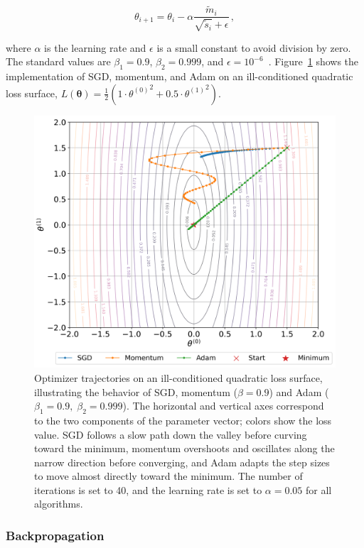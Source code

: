 \begin{equation}
\label{eq:ADAM3}
\theta_{i+1} = \theta_i - \alpha \frac{\tilde m_i}{\sqrt{\tilde s_i} + \epsilon} \,,
\end{equation}

\noindent where $\alpha$ is the learning rate and $\epsilon$ is a small constant to avoid division by zero. The standard values are $\beta_1 = 0.9$, $\beta_2 = 0.999$, and $\epsilon = 10^{-6}$~\cite{murphy_probabilistic_2022}. Figure~\ref{fig:Optimization_plots} shows the implementation of SGD, momentum, and Adam on an ill-conditioned quadratic loss surface, $L(\boldsymbol{\theta}) = \frac{1}{2} \left( 1 \cdot {\theta^{(0)}}^2 + 0.5 \cdot {\theta^{(1)}}^2 \right)$.

\begin{figure}
    \centering
    \includegraphics[width=0.85\linewidth]{figures/04_transformer/Transformer_optimization.png}
    \caption{Optimizer trajectories on an ill-conditioned quadratic loss surface, illustrating the behavior of SGD, momentum ($\beta = 0.9$) and Adam ($\beta_1 = 0.9, \; \beta_2 = 0.999$). The horizontal and vertical axes correspond to the two components of the parameter vector; colors show the loss value. SGD follows a slow path down the valley before curving toward the minimum, momentum overshoots and oscillates along the narrow direction before converging, and Adam adapts the step sizes to move almost directly toward the minimum. The number of iterations is set to 40, and the learning rate is set to $\alpha = 0.05$ for all algorithms.}
\label{fig:Optimization_plots}
\end{figure}

\subsubsection{Backpropagation}

